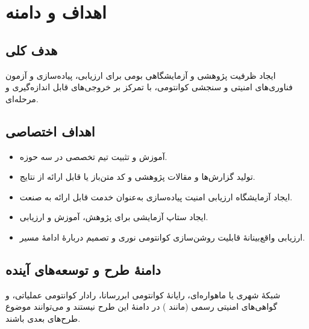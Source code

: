 \section{اهداف و دامنه}
\subsection{هدف کلی}
ایجاد ظرفیت پژوهشی و آزمایشگاهی بومی برای ارزیابی، پیاده‌سازی و آزمون فناوری‌های امنیتی و سنجشی کوانتومی، با تمرکز بر خروجی‌های قابل اندازه‌گیری و مرحله‌ای.

\subsection{اهداف اختصاصی}
\begin{itemize}[leftmargin=*,itemsep=2pt]
\item آموزش و تثبیت تیم تخصصی در سه حوزه.
\item تولید گزارش‌ها و مقالات پژوهشی و کد متن‌باز یا قابل ارائه از نتایج.
\item ایجاد آزمایشگاه ارزیابی امنیت پیاده‌سازی  به‌عنوان خدمت قابل ارائه به صنعت.
\item ایجاد ستاپ آزمایشی  برای پژوهش، آموزش و ارزیابی.
\item ارزیابی واقع‌بینانهٔ قابلیت روشن‌سازی کوانتومی نوری و تصمیم دربارهٔ ادامهٔ مسیر.
\end{itemize}

\subsection{دامنهٔ طرح و توسعه‌های آینده}
شبکهٔ  شهری یا ماهواره‌ای، رایانهٔ کوانتومی ابررسانا، رادار کوانتومی عملیاتی، و گواهی‌های امنیتی رسمی (مانند ) در دامنهٔ این طرح نیستند و می‌توانند موضوع طرح‌های بعدی باشند.

